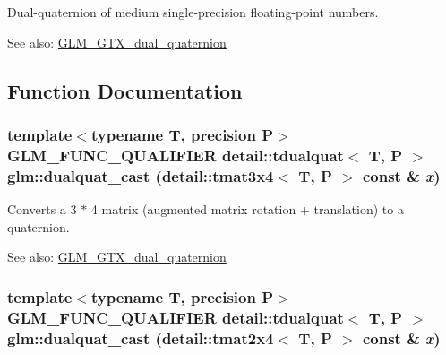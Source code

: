 Dual-quaternion of medium single-precision floating-point numbers.

\begin{Desc}
\item[See also:]\hyperlink{group__gtc__dual__quaternion}{GLM\_\-GTX\_\-dual\_\-quaternion} \end{Desc}


\subsection{Function Documentation}
\hypertarget{group__gtc__dual__quaternion_ge10828b8a3ab80fa7e9e429ebaefb9e0}{
\subsubsection[dualquat\_\-cast]{\setlength{\rightskip}{0pt plus 5cm}template$<$typename T, precision P$>$ GLM\_\-FUNC\_\-QUALIFIER detail::tdualquat$<$ T, P $>$ glm::dualquat\_\-cast (detail::tmat3x4$<$ T, P $>$ const \& {\em x})}}
\label{group__gtc__dual__quaternion_ge10828b8a3ab80fa7e9e429ebaefb9e0}


Converts a 3 $\ast$ 4 matrix (augmented matrix rotation + translation) to a quaternion.

\begin{Desc}
\item[See also:]\hyperlink{group__gtc__dual__quaternion}{GLM\_\-GTX\_\-dual\_\-quaternion} \end{Desc}
\hypertarget{group__gtc__dual__quaternion_gacea24f869d7e991fafcee55641595ec}{
\subsubsection[dualquat\_\-cast]{\setlength{\rightskip}{0pt plus 5cm}template$<$typename T, precision P$>$ GLM\_\-FUNC\_\-QUALIFIER detail::tdualquat$<$ T, P $>$ glm::dualquat\_\-cast (detail::tmat2x4$<$ T, P $>$ const \& {\em x})}}
\label{group__gtc__dual__quaternion_gacea24f869d7e991fafcee55641595ec}


